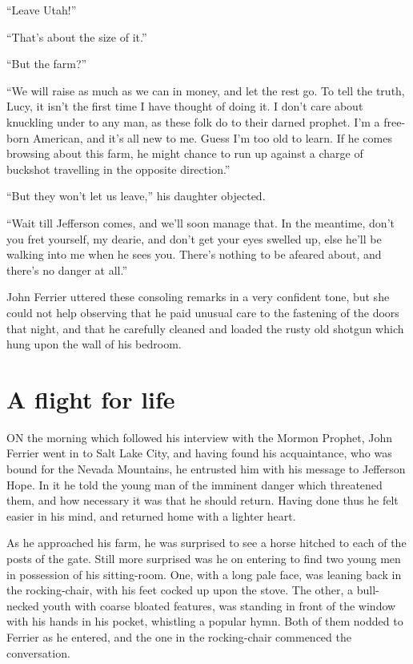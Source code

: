\documentclass[12pt]{book}
\begin{document}
“Leave Utah!” 

“That’s about the size of it.” 

“But the farm?” 

“We will raise as much as we can in money, and let the rest go. To tell the truth, Lucy, it isn’t the first time I have thought of doing it. I don’t care about knuckling under to any man, as these folk do to their darned prophet. I’m a free-born American, and it’s all new to me. Guess I’m too old to learn. If he comes browsing about this farm, he might chance to run up against a charge of buckshot travelling in the opposite direction.” 

“But they won’t let us leave,” his daughter objected. 

“Wait till Jefferson comes, and we’ll soon manage that. In the meantime, don’t you fret yourself, my dearie, and don’t get your eyes swelled up, else he’ll be walking into me when he sees you. There’s nothing to be afeared about, and there’s no danger at all.” 

John Ferrier uttered these consoling remarks in a very confident tone, but she could not help observing that he paid unusual care to the fastening of the doors that night, and that he carefully cleaned and loaded the rusty old shotgun which hung upon the wall of his bedroom. 







\chapter{A flight for life} 

ON the morning which followed his interview with the Mormon Prophet, John Ferrier went in to Salt Lake City, and having found his acquaintance, who was bound for the Nevada Mountains, he entrusted him with his message to Jefferson Hope. In it he told the young man of the imminent danger which threatened them, and how necessary it was that he should return. Having done thus he felt easier in his mind, and returned home with a lighter heart. 

As he approached his farm, he was surprised to see a horse hitched to each of the posts of the gate. Still more surprised was he on entering to find two young men in possession of his sitting-room. One, with a long pale face, was leaning back in the rocking-chair, with his feet cocked up upon the stove. The other, a bull-necked youth with coarse bloated features, was standing in front of the window with his hands in his pocket, whistling a popular hymn. Both of them nodded to Ferrier as he entered, and the one in the rocking-chair commenced the conversation. 
\end{document}
